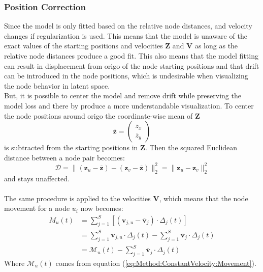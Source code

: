 \subsubsection{Position Correction}
\label{sec:Method:ProposedModel:PositionCorrection}
Since the model is only fitted based on the relative node distances, and velocity changes if regularization is used. This means that the model is unaware of the exact values of the starting positions and velocities $\textbf{Z}$ and $\textbf{V}$ as long as the relative node distances produce a good fit. This also means that the model fitting can result in displacement from origo of the node starting positions and that drift can be introduced in the node positions, which is undesirable when visualizing the node behavior in latent space.
\\
But, it is possible to center the model and remove drift while preserving the model loss and there by produce a more understandable visualization. 
To center the node positions around origo the coordinate-wise mean of $\textbf{Z}$
\begin{equation}
        \overline{\textbf{z}} = 
    \begin{pmatrix}
        \overline{z}_x \\
        \overline{z}_y
    \end{pmatrix}
\end{equation}
is subtracted from the starting positions in $\textbf{Z}$. Then the squared Euclidean distance between a node pair becomes:
\begin{equation}
    \mathcal{D} =\rVert (\textbf{z}_u-\overline{\textbf{z}}) - (\textbf{z}_v-\overline{\textbf{z}}) \rVert_2^2 = 
    \rVert \textbf{z}_u - \textbf{z}_v \rVert_2^2 
\end{equation}
and stays unaffected.
\\\\
The same procedure is applied to the velocities $\textbf{V}$, which means that the node movement for a node $u_i$ now becomes:
\begin{align}
    M_u(t) &= \sum_{j=1}^S \left[(\textbf{v}_{j,u} - \overline{\textbf{v}}_j) \cdot \Delta_{j}(t) \right] \\
    &= \sum_{j=1}^S \textbf{v}_{j, u} \cdot \Delta_{j}(t) - \sum_{j=1}^S \overline{\textbf{v}}_j \cdot \Delta_{j}(t) \\
    &= \mathcal{M}_u(t) - \sum_{j=1}^S \overline{\textbf{v}}_j \cdot \Delta_{j}(t)
\end{align}
Where $\mathcal{M}_u(t)$ comes from equation
(\ref{eq:Method:ConstantVelocity:Movement}).
